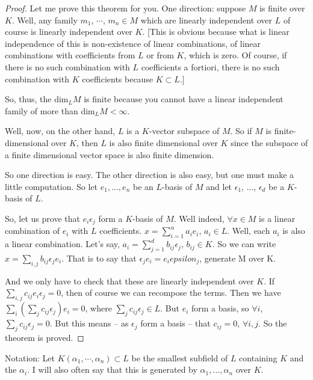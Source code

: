 \begin{proof}
Let me prove this theorem for you. One direction: suppose $M$ is finite over $K$. Well, any family $m_1$, $\cdots$, $m_n\in M$ which are linearly independent over $L$ of course is linearly independent over $K$. [This is obvious because what is linear independence of this is non-existence of linear combinations, of linear combinations with coefficients from $L$ or from $K$, which is zero. Of course, if there is no such combination with $L$ coefficients a fortiori, there is no such combination with $K$ coefficients because $K\subset L$.]

So, thus, the $\text{dim}_LM$ is finite because you cannot have a linear independent family of more than $\text{dim}_LM<\infty$. 

Well, now, on the other hand, $L$ is a $K$-vector subspace of $M$. So if $M$ is finite-dimensional over $K$, then $L$ is also finite dimensional over $K$ since the subspace of a finite dimensional vector space is also finite dimension. 

So one direction is easy. The other direction is also easy, but one must make a little computation. So let $e_1, ..., e_n$ be an $L$-basis of $M$ and let $\epsilon_1$, ..., 
$\epsilon_d$ be a $K$-basis of $L$. 

So, let us prove that $e_i \epsilon_j$ form a $K$-basis of $M$. Well indeed, $\forall x \in M$
is a linear combination of $e_i$ with $L$ coefficients. $x = \sum_{i=1}^n a_i e_i$, $a_i \in L$. Well, each $a_i$ is also a linear combination. Let's say, $a_i=\sum_{j=1}^d b_{ij} \epsilon_j$,  $b_{ij}\in K$. So we can write $x = \sum_{i, j} b_{ij} \epsilon_j e_i$. That is to say that $\epsilon_j e_i=e_i epsilon_j$, generate M over K. 

And we only have to check that these are linearly independent over $K$. If $\sum_{i, j} c_{ij} e_i \epsilon_j = 0$, then of course we can recompose the terms. Then we have $\sum_i (\sum_j c_{ij} \epsilon_j)e_i  = 0$, where $\sum_j c_{ij} \epsilon_j\in L$. But $e_i$ form a basis, so $\forall i$, $\sum_j c_{ij} \epsilon_j=0$. But this means -- as $\epsilon_j$ form a basis -- that $c_{ij}=0$, $\forall i,j$. So the theorem is proved. 
\end{proof}

\begin{definition}
Notation: Let $K(\alpha_1, \cdots, \alpha_n) \subset L$ be the smallest subfield of $L$ containing $K$ and the $\alpha_i$. I will also often say that this is generated by $\alpha_1, ..., \alpha_n$ over $K$. 
\end{definition}

